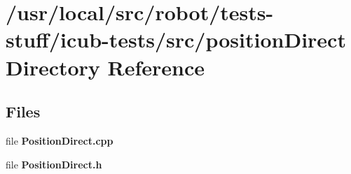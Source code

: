 \section{/usr/local/src/robot/tests-\/stuff/icub-\/tests/src/position\-Direct Directory Reference}
\label{dir_7d20153170d6a23365d8da545dc709f1}
\subsection*{Files}
\begin{DoxyCompactItemize}
\item 
file {\bfseries Position\-Direct.\-cpp}
\item 
file {\bfseries Position\-Direct.\-h}
\end{DoxyCompactItemize}
